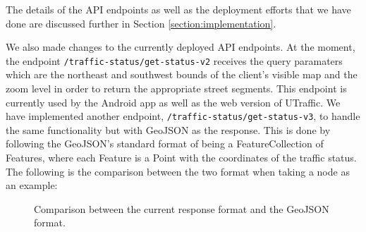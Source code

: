 The details of the API endpoints as well as the deployment efforts that we have done are discussed further in Section \ref{section:implementation}.

We also made changes to the currently deployed API endpoints. At the moment, the endpoint \lstinline{/traffic-status/get-status-v2} receives the query paramaters which are the northeast and southwest bounds of the client's visible map and the zoom level in order to return the appropriate street segments. This endpoint is currently used by the Android app as well as the web version of UTraffic. We have implemented another endpoint, \lstinline{/traffic-status/get-status-v3}, to handle the same functionality but with GeoJSON as the response. This is done by following the GeoJSON's standard format of being a FeatureCollection of Features, where each Feature is a Point with the coordinates of the traffic status. The following is the comparison between the two format when taking a node as an example:

\begin{figure}[H]
    \centering
    \hspace{0.5cm} %
    \caption{Comparison between the current response format and the GeoJSON format.}
\end{figure}

